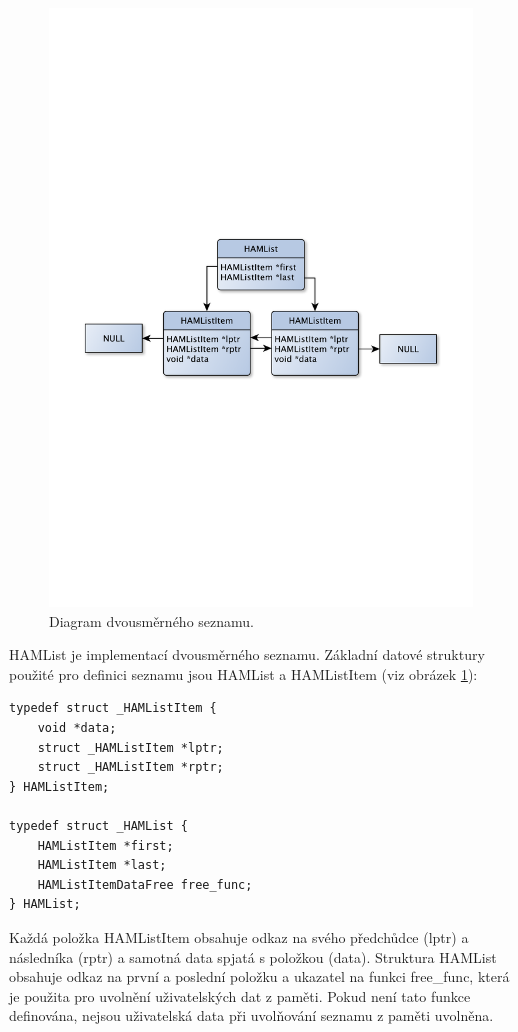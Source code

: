 \begin{figure}[h]
\centering
\includegraphics[trim=8cm 8cm 8cm 8cm, scale=0.6]{fig/list}
\caption{Diagram dvousměrného seznamu.}
\label{fig:hamlist}
\end{figure}

HAMList je implementací dvousměrného seznamu. Základní datové struktury použité pro definici seznamu jsou
HAMList a HAMListItem (viz obrázek \ref{fig:hamlist}):

\begin{verbatim}
typedef struct _HAMListItem {
	void *data;
	struct _HAMListItem *lptr;
	struct _HAMListItem *rptr;
} HAMListItem;

typedef struct _HAMList {
	HAMListItem *first;
	HAMListItem *last;
	HAMListItemDataFree free_func;
} HAMList;
\end{verbatim}

Každá položka HAMListItem obsahuje odkaz na svého předchůdce (lptr) a následníka (rptr) a samotná data spjatá
s položkou (data). Struktura HAMList obsahuje odkaz na první a poslední položku a ukazatel na funkci free\_func,
která je použita pro uvolnění uživatelských dat z paměti. Pokud není tato funkce definována, nejsou uživatelská
data při uvolňování seznamu z paměti uvolněna.


